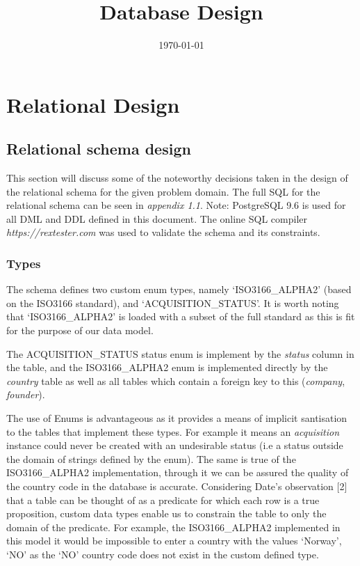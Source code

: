 \documentclass[12pt]{article}
\title{Database Design}
\date{\today}
\begin{document}
\maketitle

\section{Relational Design}

\subsection{Relational schema design}
This section will discuss some of the noteworthy decisions taken in the design of the relational schema for the given problem domain.
The full SQL for the relational schema can be seen in \emph{appendix 1.1}. Note: PostgreSQL 9.6 is used for all DML and DDL defined in this document. The online SQL compiler \emph{https://rextester.com} was used to validate the schema and its constraints.

\subsubsection{Types}
The schema defines two custom enum types, namely  `ISO3166\_ALPHA2' (based on the ISO3166 standard), and `ACQUISITION\_STATUS'. It is worth noting that `ISO3166\_ALPHA2' is loaded with a subset of the full standard as this is fit for the purpose of our data model.

The ACQUISITION\_STATUS status enum is implement by the \emph{status} column in the  table, and the ISO3166\_ALPHA2 enum is implemented directly by the \emph{country} table as well as all tables which contain a foreign key to this (\emph{company}, \emph{founder}).

The use of Enums is advantageous as it provides a means of implicit santisation to the tables that implement these types. For example it means an \emph{acquisition} instance could never be created with an undesirable status (i.e a status outside the domain of strings defined by the enum). The same is true of the ISO3166\_ALPHA2 implementation, through it we can be assured the quality of the country code in the database is accurate. Considering Date's observation [2] that a table can be thought of as a predicate for which each row is a true proposition, custom data types enable us to constrain the table to only the domain of the predicate. For example, the ISO3166\_ALPHA2 implemented in this model it would be impossible to enter a country with the values `Norway', `NO' as the `NO' country code does not exist in the custom defined type.
\end{document}
